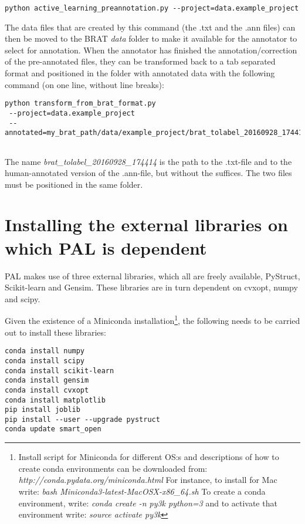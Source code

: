\documentclass{report}
\begin{document}
{\footnotesize
\begin{verbatim}
python active_learning_preannotation.py --project=data.example_project

\end{verbatim}}

The data files that are created by this command (the .txt and the .ann files) can then be moved to the BRAT \emph{data} folder to make it available for the annotator to select for annotation. When the annotator has finished the annotation/correction of the pre-annotated files, they can be transformed back to a tab separated format and positioned in the folder with annotated data with the following command (on one line, without line breaks):

{\footnotesize
\begin{verbatim}
python transform_from_brat_format.py 
 --project=data.example_project
 --annotated=my_brat_path/data/example_project/brat_tolabel_20160928_174414
 
\end{verbatim}}

The name \emph{brat\_tolabel\_20160928\_174414} is the path to the .txt-file and to the human-annotated version of the .ann-file, but without the suffices. The two files must be positioned in the same folder.

\section*{Installing the external libraries on which PAL is dependent}
PAL makes use of three external libraries, which all are freely available, PyStruct, Scikit-learn and Gensim. These libraries are in turn dependent on cvxopt, numpy and scipy.

Given the existence of  a Miniconda installation\footnote{Install script for Miniconda for different OS:s and descriptions of how to create conda environments can be downloaded from: \newline \emph{http://conda.pydata.org/miniconda.html} \newline For instance, to install for Mac write: \newline \emph{bash Miniconda3-latest-MacOSX-x86\_64.sh} \newline To create a conda environment, write: \newline \emph{conda create -n py3k python=3}  \newline and to activate that environment write: \newline \emph{source activate py3k}}, the following needs to be carried out to install these libraries:

{\footnotesize \begin{verbatim}
conda install numpy
conda install scipy
conda install scikit-learn
conda install gensim
conda install cvxopt
conda install matplotlib
pip install joblib
pip install --user --upgrade pystruct
conda update smart_open
\end{verbatim}}
\end{document}
